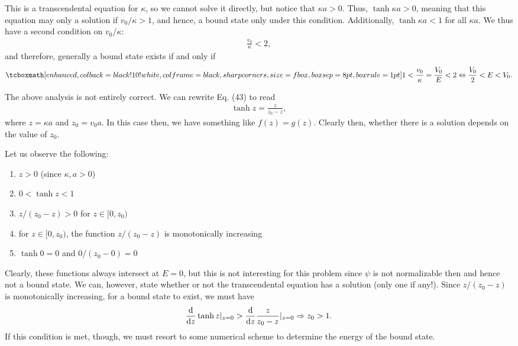 {This is a transcendental equation for $\kappa$, so we cannot solve it directly, but notice that $\kappa a > 0$.
Thus, $\tanh{\kappa a} > 0$, meaning that this equation may only a solution if $v_0/\kappa > 1$, and hence, a bound state only under this condition.
Additionally, $\tanh{\kappa a} < 1$ for all $\kappa a$.
We thus have a second condition on $v_0/\kappa$:
\begin{eqnarray}
    \frac{v_0}{\kappa} < 2
,\end{eqnarray}
and therefore, generally a bound state exists if and only if
\begin{eqnarray}
    \eqbox{ 1 < \frac{v_0}{\kappa} = \frac{V_0}{E} < 2 \Leftrightarrow \frac{V_0}{2} < E < V_0 }
.\end{eqnarray}

{

\color{red} The above analysis is not entirely correct.
We can rewrite Eq. (43) to read
\begin{eqnarray}
    \tanh{z} = \frac{z}{z_0 - z}
,\end{eqnarray}
where $z = \kappa a$ and $z_0 = v_0 a$.
In this case then, we have something like $f(z) = g(z)$.
Clearly then, whether there is a solution depends on the value of $z_0$.

Let us observe the following:
\begin{enumerate}
    \item $z > 0$ (since $\kappa,a > 0$)
    \item $0 < \tanh{z} < 1$
    \item $z/(z_0 - z) > 0$ for $z \in [0,z_0)$
    \item for $z \in [0,z_0)$, the function $z/(z_0-z)$ is monotonically increasing
    \item $\tanh{0} = 0$ and $0/(z_0-0) = 0$
\end{enumerate}

Clearly, these functions always intersect at $E = 0$, but this is not interesting for this problem since $\psi$ is not normalizable then and hence not a bound state.
We can, however, state whether or not the transcendental equation has a solution (only one if any!).
Since $z/(z_0-z)$ is monotonically increasing, for a bound state to exist, we must have
\begin{eqnarray}
    \dv{z} \tanh{z}|_{z = 0} > \dv{z} \frac{z}{z_0 - z} |_{z=0} \Rightarrow z_0 > 1
.\end{eqnarray}
If this condition is met, though, we must resort to some numerical scheme to determine the energy of the bound state.

}


}


